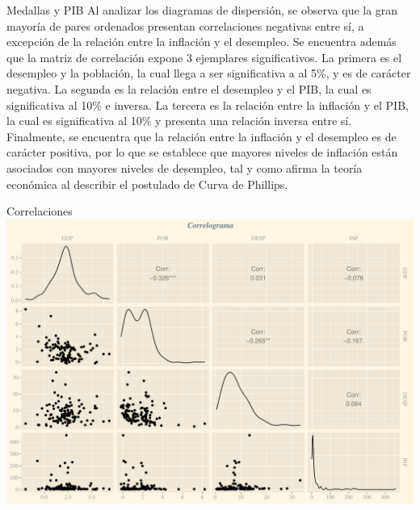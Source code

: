 \documentclass[
  ignorenonframetext,
]{beamer}
\begin{document}
\begin{frame}{Medallas y PIB}
\protect\hypertarget{medallas-y-pib-2}{}
Al analizar los diagramas de dispersión, se observa que la gran mayoría
de pares ordenados presentan correlaciones negativas entre sí, a
excepción de la relación entre la inflación y el desempleo. Se encuentra
además que la matriz de correlación expone 3 ejemplares significativos.
La primera es el desempleo y la población, la cual llega a ser
significativa a al 5\%, y es de carácter negativa. La segunda es la
relación entre el desempleo y el PIB, la cual es significativa al 10\% e
inversa. La tercera es la relación entre la inflación y el PIB, la cual
es significativa al 10\% y presenta una relación inversa entre sí.
Finalmente, se encuentra que la relación entre la inflación y el
desempleo es de carácter positiva, por lo que se establece que mayores
niveles de inflación están asociados con mayores niveles de desempleo,
tal y como afirma la teoría económica al describir el postulado de Curva
de Phillips.
\end{frame}

\begin{frame}{Correlaciones}
\protect\hypertarget{correlaciones}{}
\includegraphics{Presentacion_files/figure-beamer/unnamed-chunk-11-1.pdf}
\end{frame}
\end{document}

